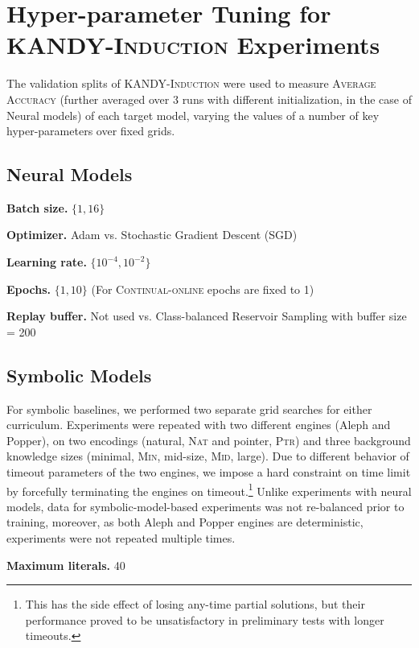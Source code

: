 \chapter{Hyper-parameter Tuning for \textsc{KANDY-Induction} Experiments}\label{app:kandyhyper}

The validation splits of \textsc{KANDY-Induction} were used to measure \textsc{Average Accuracy} (further averaged over $3$ runs with different initialization, in the case of Neural models) of each target model, varying the values of a number of key hyper-parameters over fixed grids.

\section{Neural Models}
\label{sec:appendix_hyper}

\noindent\textbf{Batch size.} $\{1, 16\}$

\noindent\textbf{Optimizer.} Adam vs. Stochastic Gradient Descent (SGD)

\noindent\textbf{Learning rate.} $\{10^{-4}, 10^{-2}\}$

\noindent\textbf{Epochs.} $\{1, 10\}$ (For \textsc{Continual-online} epochs are fixed to 1)

\noindent\textbf{Replay buffer.} Not used vs. Class-balanced Reservoir Sampling with buffer size = 200

\section{Symbolic Models}
For symbolic baselines, we performed two separate grid searches for either curriculum. Experiments were repeated with two different engines (Aleph and Popper), on two encodings (natural, \textsc{Nat} and pointer, \textsc{Ptr}) and three background knowledge sizes (minimal, \textsc{Min}, mid-size, \textsc{Mid}, large). Due to different behavior of timeout parameters of the two engines, we impose a hard constraint on time limit by forcefully terminating the engines on timeout.\footnote{This has the side effect of losing any-time partial solutions, but their performance proved to be unsatisfactory in preliminary tests with longer timeouts.}
%
Unlike experiments with neural models, data for symbolic-model-based experiments was not re-balanced prior to training, moreover, as both Aleph and Popper engines are deterministic, experiments were not repeated multiple times.

\noindent\textbf{Maximum literals.} 40

